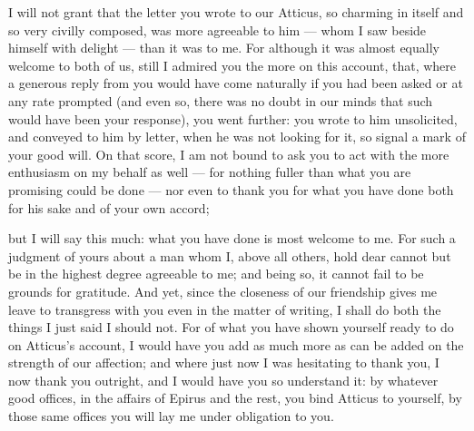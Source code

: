 

 I will not grant that the letter you wrote to our Atticus, so charming in itself and so very civilly composed, was more agreeable to him --- whom I saw beside himself with delight --- than it was to me. For although it was almost equally welcome to both of us, still I admired you the more on this account, that, where a generous reply from you would have come naturally if you had been asked or at any rate prompted (and even so, there was no doubt in our minds that such would have been your response), you went further: you wrote to him unsolicited, and conveyed to him by letter, when he was not looking for it, so signal a mark of your good will. On that score, I am not bound to ask you to act with the more enthusiasm on my behalf as well --- for nothing fuller than what you are promising could be done --- nor even to thank you for what you have done both for his sake and of your own accord;

 but I will say this much: what you have done is most welcome to me. For such a judgment of yours about a man whom I, above all others, hold dear cannot but be in the highest degree agreeable to me; and being so, it cannot fail to be grounds for gratitude. And yet, since the closeness of our friendship gives me leave to transgress with you even in the matter of writing, I shall do both the things I just said I should not. For of what you have shown yourself ready to do on Atticus's account, I would have you add as much more as can be added on the strength of our affection; and where just now I was hesitating to thank you, I now thank you outright, and I would have you so understand it: by whatever good offices, in the affairs of Epirus and the rest, you bind Atticus to yourself, by those same offices you will lay me under obligation to you.
